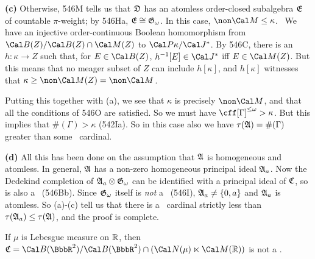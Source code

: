 {\medskip

{\bf (c)} Otherwise, 546M tells us that $\frak D$ has
an atomless order-closed
subalgebra $\frak E$ of countable $\pi$-weight;  by 546Ha,
$\frak E\cong\frak G_{\omega}$.   In this case,
$\non\Cal M\le\kappa$.   \Prf\ We have an injective
order-continuous Boolean homomorphism
from $\Cal B(Z)/\Cal B(Z)\cap\Cal M(Z)$ to $\Cal P\kappa/\Cal J^*$.
By 546C, there is an $h:\kappa\to Z$ such that, for $E\in\Cal B(Z)$,
$h^{-1}[E]\in\Cal J^*$ iff $E\in\Cal M(Z)$.   But this means that no meager subset of
$Z$ can include $h[\kappa]$, and $h[\kappa]$ witnesses that
$\kappa\ge\non\Cal M(Z)=\non\Cal M$.\ \Qed

Putting this together with (a), we see that $\kappa$ is precisely
$\non\Cal M$, and that all the conditions of 546O are satisfied.
So we must have $\cff[\Gamma]^{\le\omega}>\kappa$.
But this implies that $\#(\Gamma)>\kappa$ (542Ia).
So in this case also we have $\tau(\frak A)=\#(\Gamma)$ greater than some
\qm\ cardinal.

\medskip

{\bf (d)} All this has been done on the assumption that $\frak A$ is
homogeneous and
atomless.   In general, $\frak A$ has a non-zero homogeneous principal ideal
$\frak A_a$.   Now the Dedekind completion of
$\frak A_a\otimes\frak G_{\omega}$ can be
identified with a principal ideal of $\frak C$, so is also
a \pssqa\ (546Bb).   Since $\frak G_{\omega}$ itself is {\it not} a
\pssqa\ (546I), $\frak A_a\ne\{0,a\}$ and
$\frak A_a$ is atomless.   So (a)-(c) tell us that there is a \qm\ cardinal strictly
less than $\tau(\frak A_a)\le\tau(\frak A)$, and the proof is complete.
}%

 If $\mu$ is Lebesgue measure on $\Bbb R$, then
$\frak C
=\Cal B(\BbbR^2)/\Cal B(\BbbR^2)\cap(\Cal N(\mu)\ltimes\Cal M(\Bbb R))$
is not a \pssqa.


